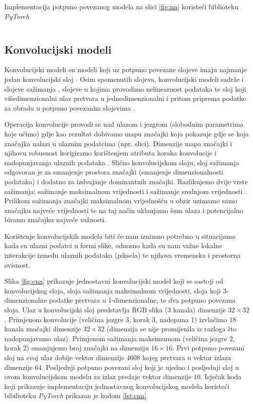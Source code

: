 \begin{listing}[H]
    \caption{Implementacija potpuno povezanog modela na slici \ref{fig:nn} koristeći biblioteku \textit{PyTorch}}
    \inputminted{python}{snippets/fcn.py}
    \label{lst:fcn}
\end{listing}

\subsection{Konvolucijski modeli}

Konvolucijski modeli  su modeli koji uz potpuno povezane slojeve imaju najmanje jedan konvolucijski sloj . Osim spomenutih slojeva, konvolucijski modeli sadrže i slojeve sažimanja , slojeve u kojima provodimo nelinearnost podataka te sloj koji višedimenzionalni ulaz pretvara u jednodimenzionalni i pritom priprema podatke za obradu u potpuno povezanim slojevima .

Operacija konvolucije provodi se nad ulazom i jezgrom  (slobodnim parametrima koje učimo) gdje kao rezultat dobivamo mapu značajki koja pokazuje gdje se koja značajka nalazi u ulaznim podatcima (npr. slici). Dimenzije mapa značajki i njihovu robusnost korigiramo korištenjem atributa koraka konvolucije  i nadopunjavanja ulaznih podataka . Slično konvolucijskom sloju, sloj sažimanja odgovoran je za smanjenje prostora značajki (smanjenje dimenzionalnosti podataka) i dodatno za izdvajanje dominantnih značajki. Razlikujemo dvije vrste sažimanja: sažimanje maksimalnom vrijednosti  i sažimanje srednjom vrijednosti . Prilikom sažimanja značajki maksimalnom vrijednošću u obzir uzimamo samo značajku najveće vrijednosti te na taj način uklanjamo šum ulaza i potencijalno biramo značajku najveće važnosti.

Korištenje konvolucijskih modela biti će nam iznimno potrebno u situacijama kada su ulazni podatci u formi slike, odnosno kada su nam važne lokalne interakcije između ulaznih podataka (piksela) te njihova vremenska i prostorna ovisnost.

Slika \ref{fig:cnn} \cite{NNsvg} prikazuje jednostavni konvolucijski model koji se sastoji od konvolucijskog sloja, sloja sažimanja maksimalnom vrijednosti, sloja koji 3-dimenzionalne podatke pretvara u 1-dimenzionalne, te dva potpuno povezana sloja. Ulaz u konvolucijski sloj predstavlja RGB slika (3 kanala) dimenzije $32 \times 32$. Primjenom konvolucije (veličina jezgre 3, korak 3, nadopuna 1) izvlačimo 18 kanala značajki dimenzije $32 \times 32$ (dimenzija se nije promijenila iz razloga što nadopunjavamo ulaz). Primjenom sažimanja maksimumom (veličina jezgre 2, korak 2) smanjujemo broj značajki na dimenziju $16 \times 16$. Prvi potpuno povezani sloj na svoj ulaz dobije vektor dimenzije $4608$ kojeg pretvara u vektor izlaza dimenzije $64$. Posljednji potpuno povezani sloj koji je ujedno i posljednji sloj u ovom konvolucijskom modelu za izlaz predaje vektor dimenzije $10$. Isječak koda koji prikazuje implementaciju jednostavnog konvolucijskog modela koristeći bibilioteku \textit{PyTorch} prikazan je kodom \ref{lst:cnn}.


